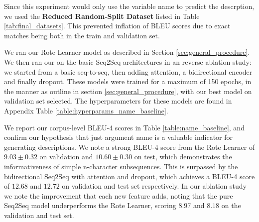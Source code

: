 Since this experiment would only use the variable name to predict the descrption, we used the \textbf{Reduced Random-Split Dataset} listed in Table \ref{tab:final_datasets}.
This prevented inflation of BLEU scores due to exact matches being both in the train and validation set.

We ran our Rote Learner model as described in Section \ref{sec:general_procedure}. We then ran our on the basic Seq2Seq architectures in an reverse ablation study: we started from a basic seq-to-seq, then adding attention, a bidirectional encoder and finally dropout.
These models were trained for a maximum of 150 epochs, in the manner as outline in section \ref{sec:general_procedure}, with our best model on validation set selected. 
The hyperparameters for these models are found in Appendix Table \ref{table:hyperparams_name_baseline}.

We report our corpus-level BLEU-4 scores in Table \ref{table:name_baseline}, and confirm our hypothesis that just argument name is a valuable indicator for generating descriptions. We note a strong BLEU-4 score from the Rote Learner of $9.03 \pm 0.32$ on validation and $10.60 \pm  0.30$ on test, which demonstrates the informativeness of simple n-character subsequences. 
This is surpassed by the bidirectional Seq2Seq with attention and dropout,  which achieves a BLEU-4 score of $12.68 $ and $12.72$ on validation and test set respectively.
In our ablation study we note the improvement that each new feature adds, noting that the pure Seq2Seq model underperforms the Rote Learner, scoring $8.97$ and $ 8.18 $ on the validation and test set. 



